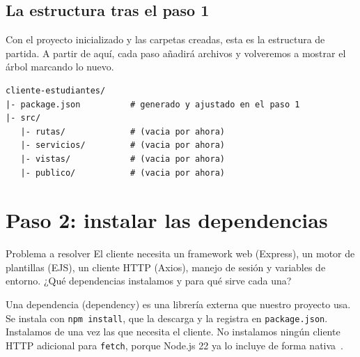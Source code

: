 \documentclass[11pt]{article}
\begin{document}
\subsection{La estructura tras el paso 1}
Con el proyecto inicializado y las carpetas creadas, esta es la estructura de partida. A partir de aquí, cada paso añadirá archivos y volveremos a mostrar el árbol marcando lo nuevo.

\begin{cajacodigo}
\begin{lstlisting}[style=markup]
cliente-estudiantes/
|- package.json          # generado y ajustado en el paso 1
|- src/
   |- rutas/             # (vacia por ahora)
   |- servicios/         # (vacia por ahora)
   |- vistas/            # (vacia por ahora)
   |- publico/           # (vacia por ahora)
\end{lstlisting}
\end{cajacodigo}
\vspace{2pt}

\section{Paso 2: instalar las dependencias}
\begin{cajaproblema}{Problema a resolver}
El cliente necesita un framework web (Express), un motor de plantillas (EJS), un cliente HTTP (Axios), manejo de sesión y variables de entorno. ¿Qué dependencias instalamos y para qué sirve cada una?\par
\end{cajaproblema}
Una dependencia (dependency) es una librería externa que nuestro proyecto usa. Se instala con \texttt{npm install}, que la descarga y la registra en \texttt{package.\allowbreak{}json}. Instalamos de una vez las que necesita el cliente. No instalamos ningún cliente HTTP adicional para \texttt{fetch}, porque Node.js 22 ya lo incluye de forma nativa~\citep{whatwg2024fetch}.
\end{document}
